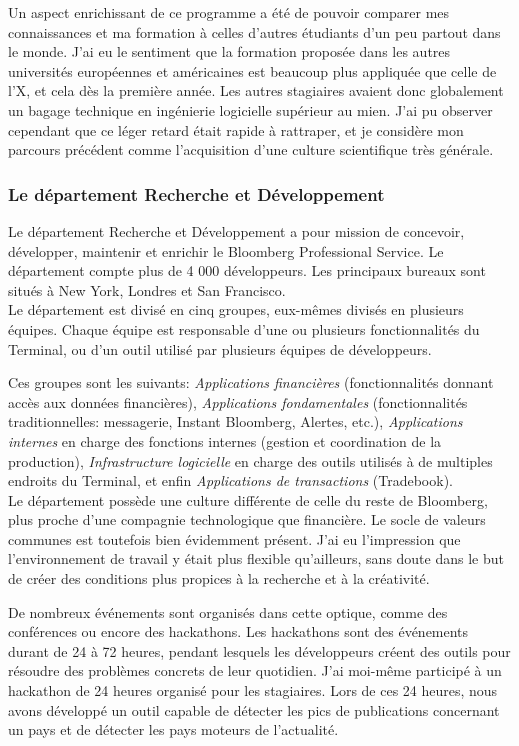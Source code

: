 \documentclass[11pt, oneside, titlepage, a4paper]{article}
\begin{document}
Un aspect enrichissant de ce programme a été de pouvoir comparer mes connaissances et ma formation à celles d'autres étudiants d'un peu partout dans le monde. J'ai eu le sentiment que la formation proposée dans les autres universités européennes et américaines est beaucoup plus \og appliquée \fg{} que celle de l'X, et cela dès la première année. Les autres stagiaires avaient donc globalement un bagage technique en ingénierie logicielle supérieur au mien. J'ai pu observer cependant que ce léger retard était rapide à rattraper, et je considère mon parcours précédent comme l'acquisition d'une culture scientifique très générale.
		\subsubsection{Le département Recherche et Développement} \label{RD}
Le département Recherche et Développement a pour mission de concevoir, développer, maintenir et enrichir le Bloomberg Professional Service. Le département compte plus de 4 000 développeurs. Les principaux bureaux sont situés à New York, Londres et San Francisco.
\\

Le département est divisé en cinq groupes, eux-mêmes divisés en plusieurs équipes. Chaque équipe est responsable d'une ou plusieurs fonctionnalités du Terminal, ou d'un outil utilisé par plusieurs équipes de développeurs.

Ces groupes sont les suivants: \textit{Applications financières} (fonctionnalités donnant accès aux données financières), \textit{Applications fondamentales} (fonctionnalités traditionnelles: messagerie, Instant Bloomberg, Alertes, etc.), \textit{Applications internes} en charge des fonctions internes (gestion et coordination de la production), \textit{Infrastructure logicielle} en charge des outils utilisés à de multiples endroits du Terminal, et enfin \textit{Applications de transactions} (Tradebook).
\\

Le département possède une culture différente de celle du reste de Bloomberg, plus proche d'une compagnie technologique que financière. Le socle de valeurs communes est toutefois bien évidemment présent. J'ai eu l'impression que l'environnement de travail y était plus flexible qu'ailleurs, sans doute dans le but de créer des conditions plus propices à la recherche et à la créativité.

De nombreux événements sont organisés dans cette optique, comme des conférences ou encore des hackathons. Les hackathons sont des événements durant de 24 à 72 heures, pendant lesquels les développeurs créent des outils pour résoudre des problèmes concrets de leur quotidien. J'ai moi-même participé à un hackathon de 24 heures organisé pour les stagiaires. Lors de ces 24 heures, nous avons développé un outil capable de détecter les pics de publications concernant un pays et de détecter les pays \og moteurs\fg{} de l'actualité.
\\
\end{document}
